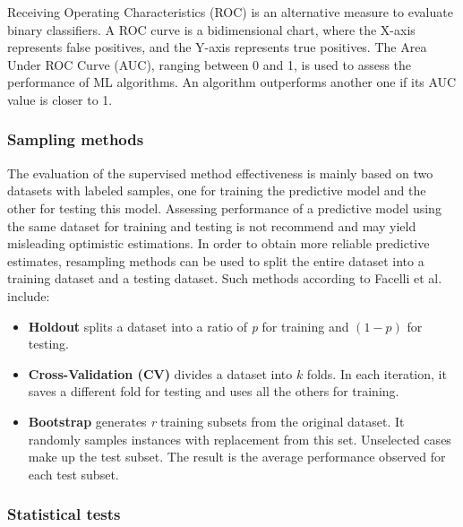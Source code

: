 Receiving Operating Characteristics (ROC) is an alternative measure to evaluate binary classifiers. A ROC curve\cite{Japkowicz:2011} is a bidimensional chart, where the X-axis represents false positives, and the Y-axis represents true positives. The Area Under ROC Curve (AUC), ranging between 0 and 1, is used to assess the performance of ML algorithms. An algorithm outperforms another one if its AUC value is closer to 1. 

\subsubsection{Sampling methods}
The evaluation of the supervised method effectiveness is mainly based on two datasets with labeled samples, one for training the predictive model and the other for testing this model. Assessing performance of a predictive model using the same dataset for training and testing is not recommend and may yield misleading optimistic estimations\cite{Japkowicz:2011}. In order to obtain more reliable predictive estimates, resampling methods can be used to split the entire dataset into a training dataset and a testing dataset. Such methods according to  Facelli et al. \cite{Facelli:2015} include: 
\begin{itemize} 
  \item \textbf{Holdout} splits a dataset into a ratio of \textit{p} for training and $(1 - p)$ for testing. 
  \item \textbf{Cross-Validation (CV)} divides a dataset into $k$ folds. In each iteration, it saves a different fold for testing and uses all the others for training. 
  \item \textbf{Bootstrap} generates \textit{r} training subsets from the original dataset. It randomly samples instances with replacement from this set. Unselected cases make up the test subset. The result is the average performance observed for each test subset.
\end{itemize}

\subsubsection{Statistical tests}

